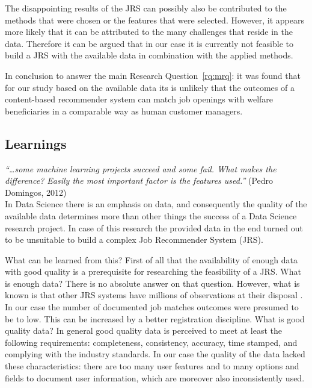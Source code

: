 The disappointing results of the JRS can possibly also be contributed to the methods that were chosen or the features that were selected. 
However, it appears more likely that it can be attributed to the many challenges that reside in the data.
Therefore it can be argued that in our case it is currently not feasible to build a JRS with the available data in combination with the applied methods. 

In conclusion to answer the main Research Question~\ref{rq:mrq}: it was found that for our study based on the available data its is unlikely that the outcomes of a content-based recommender system can match job openings with welfare beneficiaries in a comparable way as human customer managers. 
\subsection{Learnings}
\label{ssec:learnings}

\textit{“…some machine learning projects succeed and some fail. What makes the difference?  Easily the most important factor is the features used.”} (Pedro Domingos, 2012) \nocite{domingos2012few} \\

\noindent In Data Science there is an emphasis on data, and consequently the quality of the available data determines more than other things the success of a Data Science research project.
In case of this research the provided data in the end turned out to be unsuitable to build a complex Job Recommender System (JRS). 

What can be learned from this? 
First of all that the availability of enough data with good quality is a prerequisite for researching the feasibility of a JRS.
What is enough data?
There is no absolute answer on that question. 
However, what is known is that other JRS systems have millions of observations at their disposal \cite{kenthapadi2017personalized, T.Al-Otaibi2012ASystems, Zheng2012JobSurvey, hong2013job}.
In our case the number of documented job matches outcomes were presumed to be to low. 
This can be increased by a better registration discipline.
What is good quality data?
In general good quality data is perceived to meet at least the following requirements: completeness, consistency, accuracy, time stamped, and complying with the industry standards. 
In our case the quality of the data lacked these characteristics: there are too many user features and to many options and fields to document user information, which are moreover also inconsistently used. 

